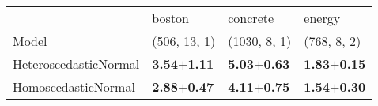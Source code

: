 \begin{tabular}{llll}
\toprule
{} &                           boston &                         concrete &                           energy \\
Model& (506, 13, 1)& (1030, 8, 1)& (768, 8, 2)\\
\midrule
HeteroscedasticNormal &           \textbf{3.54$\pm$1.11} &           \textbf{5.03$\pm$0.63} &           \textbf{1.83$\pm$0.15} \\
HomoscedasticNormal   &  \textbf{\textbf{2.88$\pm$0.47}} &  \textbf{\textbf{4.11$\pm$0.75}} &  \textbf{\textbf{1.54$\pm$0.30}} \\
\bottomrule
\end{tabular}

